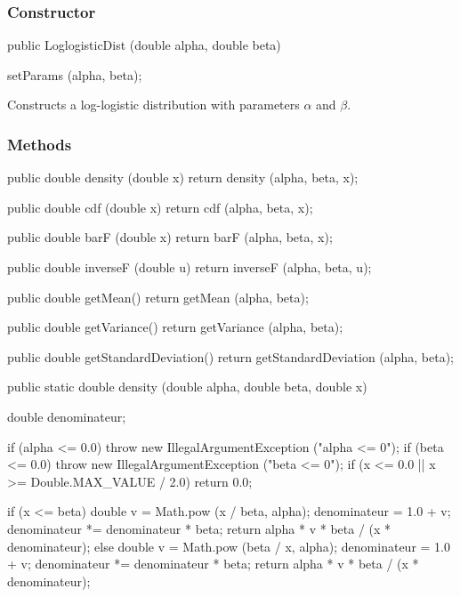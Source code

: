 \subsubsection* {Constructor}

\begin{code}

   public LoglogisticDist (double alpha, double beta)\begin{hide} {
      setParams (alpha, beta);
   }\end{hide}
\end{code}
\begin{tabb}
   Constructs a log-logistic distribution with parameters
   $\alpha$ and $\beta$.
\end{tabb}

\subsubsection* {Methods}
\begin{hide}
\begin{code}

   public double density (double x) {
      return density (alpha, beta, x);
   }

   public double cdf (double x) {
      return cdf (alpha, beta, x);
   }

   public double barF (double x) {
      return barF (alpha, beta, x);
   }

   public double inverseF (double u) {
      return inverseF (alpha, beta, u);
   }

   public double getMean() {
      return getMean (alpha, beta);
   }

   public double getVariance() {
      return getVariance (alpha, beta);
   }

   public double getStandardDeviation() {
      return getStandardDeviation (alpha, beta);
   }
\end{code}
\end{hide}\begin{code}
   public static double density (double alpha, double beta, double x)\begin{hide} {
      double denominateur;

      if (alpha <= 0.0)
         throw new IllegalArgumentException ("alpha <= 0");
      if (beta <= 0.0)
         throw new IllegalArgumentException ("beta <= 0");
      if (x <= 0.0 || x >= Double.MAX_VALUE / 2.0)
         return 0.0;

      if (x <= beta) {
         double v = Math.pow (x / beta, alpha);
         denominateur = 1.0 + v;
         denominateur *= denominateur * beta;
         return alpha * v * beta / (x * denominateur);
      } else {
         double v = Math.pow (beta / x, alpha);
         denominateur = 1.0 + v;
         denominateur *= denominateur * beta;
         return alpha * v * beta / (x * denominateur);
      }
   }\end{hide}
\end{code}
